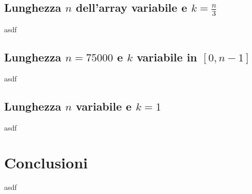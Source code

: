 \documentclass{article}
\begin{document}
	\subsection{Lunghezza $n$ dell'array variabile e $k=\frac{n}{3}$}
	asdf
	\newpage
	\subsection{Lunghezza $n=75000$ e $k$ variabile in $[0,n-1]$}
	asdf
	\newpage
	\subsection{Lunghezza $n$ variabile e $k=1$}
	asdf
	\newpage
	\section{Conclusioni}
	asdf
\end{document}
